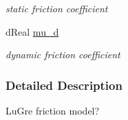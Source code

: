 \begin{DoxyCompactItemize}
\begin{DoxyCompactList}\small\item\em static friction coefficient \item\end{DoxyCompactList}\item 
\hypertarget{structOpenRAVE_1_1SensorBase_1_1TactileGeomData_1_1Friction_a0ce7c7568d43ae948cd84b283b404cbf}{
dReal \hyperlink{structOpenRAVE_1_1SensorBase_1_1TactileGeomData_1_1Friction_a0ce7c7568d43ae948cd84b283b404cbf}{mu\_\-d}}
\label{structOpenRAVE_1_1SensorBase_1_1TactileGeomData_1_1Friction_a0ce7c7568d43ae948cd84b283b404cbf}

\begin{DoxyCompactList}\small\item\em dynamic friction coefficient \item\end{DoxyCompactList}\end{DoxyCompactItemize}


\subsubsection{Detailed Description}
LuGre friction model? 